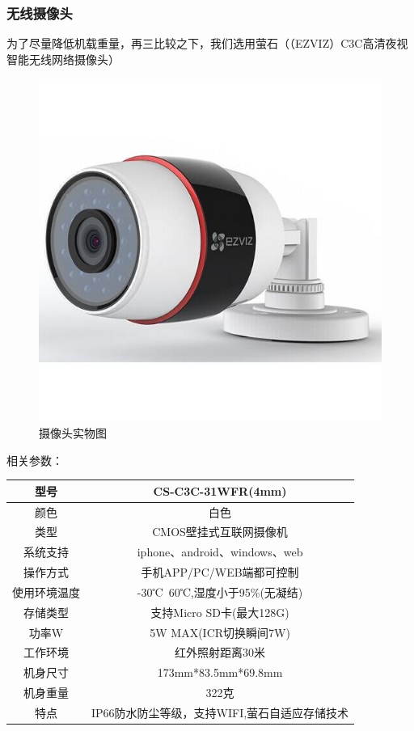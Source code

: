 \documentclass{ctexart}
\begin{document}
\subsubsection{无线摄像头}
为了尽量降低机载重量，再三比较之下，我们选用萤石（（EZVIZ）C3C高清夜视 智能无线网络摄像头）
\begin{figure}[H]
\centering
    \includegraphics[width = \textwidth]{030}
    \caption{摄像头实物图}\par
\end{figure}
相关参数：
\begin{center}
\begin{longtable}{|c|c|}
\hline
型号	&CS-C3C-31WFR(4mm)\\
\hline
颜色	&白色\\
\hline
类型	&CMOS壁挂式互联网摄像机\\
\hline
系统支持	&iphone、android、windows、web\\
\hline
操作方式	&手机APP/PC/WEB端都可控制\\
\hline
使用环境温度	&-30℃~60℃,湿度小于95\%(无凝结)\\
\hline
存储类型	&支持Micro SD卡(最大128G)\\
\hline
功率W	&5W MAX(ICR切换瞬间7W)\\
\hline
工作环境	&红外照射距离30米\\
\hline
机身尺寸	&173mm*83.5mm*69.8mm\\
\hline
机身重量	&322克\\
\hline
特点	&IP66防水防尘等级，支持WIFI,萤石自适应存储技术\\
\hline

\end{longtable}
\end{center}
\end{document}
